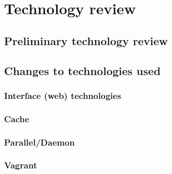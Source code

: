 \section{Technology review}

\subsection{Preliminary technology review}















\subsection{Changes to technologies used}

\subsubsection{Interface (web) technologies}


\subsubsection{Cache}


\subsubsection{Parallel/Daemon}


\subsubsection{Vagrant}

